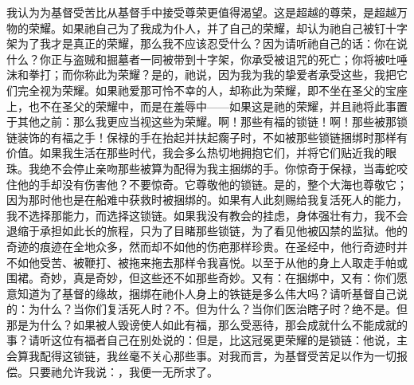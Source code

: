 我认为为基督受苦比从基督手中接受尊荣更值得渴望。这是超越的尊荣，是超越万物的荣耀。如果祂自己为了我成为仆人，并了自己的荣耀，却认为祂自己被钉十字架为了我才是真正的荣耀，那么我不应该忍受什么？因为请听祂自己的话：你在说什么？你正与盗贼和掘墓者一同被带到十字架，你承受被诅咒的死亡；你将被吐唾沫和拳打；而你称此为荣耀？是的，祂说，因为我为我的挚爱者承受这些，我把它们完全视为荣耀。如果祂爱那可怜不幸的人，却称此为荣耀，即不坐在圣父的宝座上，也不在圣父的荣耀中，而是在羞辱中——如果这是祂的荣耀，并且祂将此事置于其他之前：那么我更应当视这些为荣耀。啊！那些有福的锁链！啊！那些被那锁链装饰的有福之手！保禄的手在抬起并扶起瘸子时，不如被那些锁链捆绑时那样有价值。如果我生活在那些时代，我会多么热切地拥抱它们，并将它们贴近我的眼珠。我绝不会停止亲吻那些被算为配得为我主捆绑的手。你惊奇于保禄，当毒蛇咬住他的手却没有伤害他？不要惊奇。它尊敬他的锁链。是的，整个大海也尊敬它；因为那时他也是在船难中获救时被捆绑的。如果有人此刻赐给我复活死人的能力，我不选择那能力，而选择这锁链。如果我没有教会的挂虑，身体强壮有力，我不会退缩于承担如此长的旅程，只为了目睹那些锁链，为了看见他被囚禁的监狱。他的奇迹的痕迹在全地众多，然而却不如他的伤疤那样珍贵。在圣经中，他行奇迹时并不如他受苦、被鞭打、被拖来拖去那样令我喜悦。以至于从他的身上人取走手帕或围裙。奇妙，真是奇妙，但这些还不如那些奇妙。又有：在捆绑中，又有：你们愿意知道为了基督的缘故，捆绑在祂仆人身上的铁链是多么伟大吗？请听基督自己说的：为什么？当你们复活死人时？不。但为什么？当你们医治瞎子时？绝不是。但那是为什么？如果被人毁谤使人如此有福，那么受恶待，那会成就什么不能成就的事？请听这位有福者自己在别处说的：但是，比这冠冕更荣耀的是锁链：他说，主会算我配得这锁链，我丝毫不关心那些事。对我而言，为基督受苦足以作为一切报偿。只要祂允许我说：，我便一无所求了。\par

